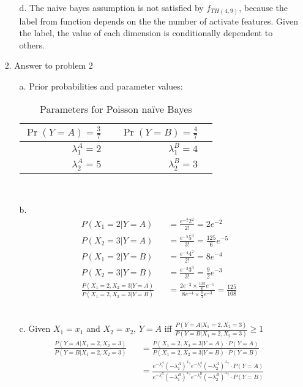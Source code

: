 \begin{enumerate}
\begin{enumerate}
	\item[d.] The naive bayes assumption is not satisfied by $f_{TH(4,9)}$, because the label from function depends on the the number of activate features. Given the label, the value of each dimension is conditionally dependent to others.\\
	\end{enumerate}
\item[2.] Answer to problem 2
	\begin{enumerate}
	\item[a.] Prior probabilities and parameter values:
		\begin{table}[!h]
		\begin{center}
		\begin{tabular}{|rp{1in}|rp{1in}|}
		\hline
		$\Pr(Y=A)= \frac{3}{7}$ & & $\Pr(Y=B)= \frac{4}{7}$ & \\ \hline
		$\lambda^A_1=2$ & & $\lambda^B_1=4$ & \\ \hline
		$\lambda^A_2=5$ & & $\lambda^B_2=3$ & \\ \hline
		\end{tabular}
		\caption{Parameters for Poisson na\"ive Bayes}
		\label{tab:poissonNBparams}
		\end{center}
		\end{table}
		\\
	\item[b.]
		\begin{eqnarray}
		P(X_1 = 2|Y=A) && = \frac{e^{-2}2^2}{2!} = 2e^{-2}\\
		P(X_2 = 3|Y=A) && = \frac{e^{-5}5^3}{3!} = \frac{125}{6}e^{-5}\\
		P(X_1 = 2|Y=B) && = \frac{e^{-4}4^2}{2!} = 8e^{-4}\\
		P(X_2 = 3|Y=B) && = \frac{e^{-3}3^3}{3!} = \frac{9}{2}e^{-3}\\
		\frac{P(X_1=2,X_2=3|Y=A)}{P(X_1=2,X_2=3|Y=B)} && = \frac{2e^{-2} \times \frac{125}{6}e^{-5}}{8e^{-4} \times \frac{9}{2}e^{-3}} = \frac{125}{108}
		\end{eqnarray}\\
	\item[c.] Given $X_1 = x_1$ and $X_2 = x_2$, $Y = A$ iff $\frac{P(Y=A|X_1=2,X_2=3)}{P(Y=B|X_1=2,X_2=3)} \geq 1$
		\begin{eqnarray}
		\frac{P(Y=A|X_1=2,X_2=3)}{P(Y=B|X_1=2,X_2=3)} && = \frac{P(X_1=2,X_2=3|Y=A)\cdot P(Y=A)}{P(X_1=2,X_2=3|Y=B)\cdot P(Y=B)}\\
		&& = \frac{e^{-\lambda_1^A} (-\lambda_1^A)^{x_1} e^{-\lambda_2^A} (-\lambda_2^A)^{x_2} \cdot P(Y=A)}{e^{-\lambda_1^B} (-\lambda_1^B)^{x_1} e^{-\lambda_2^B} (-\lambda_2^B)^{x_2} \cdot P(Y=B)}\\

\end{eqnarray}
\end{enumerate}
\end{enumerate}
